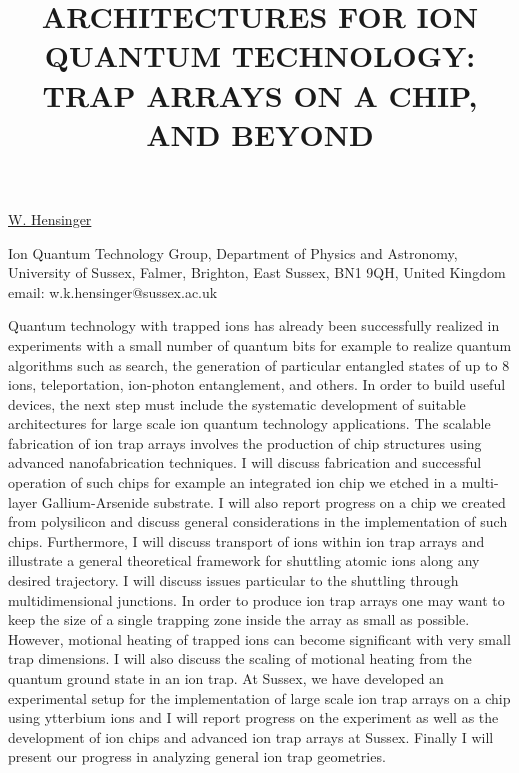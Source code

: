 \title{ARCHITECTURES FOR ION QUANTUM TECHNOLOGY: TRAP ARRAYS ON A CHIP, AND BEYOND}

\underline{W. Hensinger}


Ion Quantum Technology Group, Department of Physics and Astronomy, University of Sussex, Falmer, Brighton, East Sussex, BN1 9QH, United Kingdom\\
email: w.k.hensinger@sussex.ac.uk

Quantum technology with trapped ions has already been successfully realized in experiments with a small number of quantum bits for example to realize quantum algorithms such as search, the generation of particular entangled states of up to 8 ions, teleportation, ion-photon entanglement, and others. In order to build useful devices, the next step must include the systematic development of suitable architectures for large scale ion quantum technology applications. The scalable fabrication of ion trap arrays involves the production of chip structures using advanced nanofabrication techniques. I will discuss fabrication and successful operation of such chips for example an integrated ion chip we etched in a multi-layer Gallium-Arsenide substrate. I will also report progress on a chip we created from polysilicon and discuss general considerations in the implementation of such chips. Furthermore, I will discuss transport of ions within ion trap arrays and illustrate a general theoretical framework for shuttling atomic ions along any desired trajectory. I will discuss issues particular to the shuttling through multidimensional junctions. In order to produce ion trap arrays one may want to keep the size of a single trapping zone inside the array as small as possible. However, motional heating of trapped ions can become significant with very small trap dimensions. I will also discuss the scaling of motional heating from the quantum ground state in an ion trap. At Sussex, we have developed an experimental setup for the implementation of large scale ion trap arrays on a chip using ytterbium ions and I will report progress on the experiment as well as the development of ion chips and advanced ion trap arrays at Sussex. Finally I will present our progress in analyzing general ion trap geometries.

\vspace{\baselineskip}